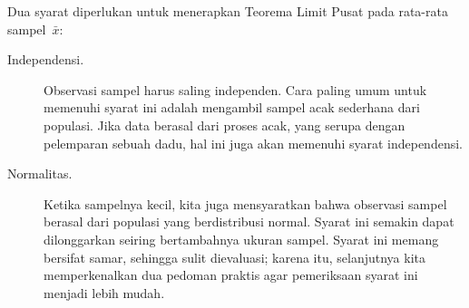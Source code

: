 \noindent%
Dua syarat diperlukan untuk menerapkan
Teorema Limit Pusat
pada rata-rata sampel~$\bar{x}$:
\begin{description}
\item[Independensi.]
    Observasi sampel harus saling independen.
    Cara paling umum untuk memenuhi syarat ini adalah
    mengambil sampel acak sederhana dari
    populasi.
    Jika data berasal dari proses acak,
    yang serupa dengan pelemparan sebuah dadu,
    hal ini juga akan memenuhi syarat independensi.
\item[Normalitas.]
    Ketika sampelnya kecil,
    kita juga mensyaratkan bahwa observasi sampel
    berasal dari populasi yang berdistribusi normal.
    Syarat ini semakin dapat dilonggarkan
    seiring bertambahnya ukuran sampel.
    Syarat ini memang bersifat samar,
    sehingga sulit dievaluasi;
    karena itu, selanjutnya kita memperkenalkan dua pedoman praktis
    agar pemeriksaan syarat ini menjadi lebih mudah.
\end{description}
%
%
%
%

